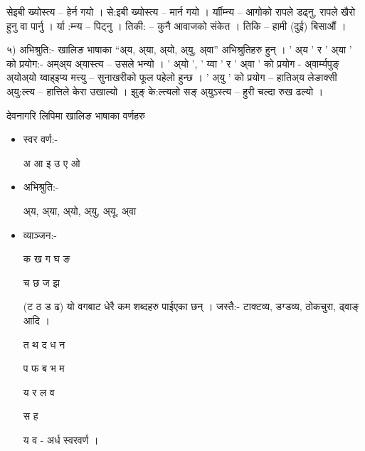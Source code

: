 सेइबी ख्योस्त्य –  हेर्न गयो । से:इबी ख्योस्त्य –  मार्न गयो ।
र्याीम्‍न्य – आगोको रापले डढ्‍नु, रापले खैरो हुनु वा पार्नु । र्या :म्‍न्य – पिट्‍नु । 
तिकी: – कुनै आवाजको संकेत । तिकि –  हामी (दुई) बिसाऔं ।

५) अभिश्रुति:- खालिङ भाषाका “अ‌्य, अ्या, अ्यो, अ्यु, अ्वा” अभिश्रुतिहरु हुन् । 
' अ्य ' र ' अ्या ' को प्रयोग:- अम्अ्य अ्यास्त्य – उसले भन्यो ।
' अ्यो ',  ' य्वा '  र  ' अ्वा ' को प्रयोग -  
अ्वार्म्यपुङ् अ्योअ्यो य्वाह्इप्य मत्त्यु – सुनाखरीको फूल पहेलो हुन्छ ।
' अ्यु ' को प्रयोग – 
हातिअ्य लेङाक्सी अ्यु:ल्त्य – हात्तिले केरा उखाल्यो ।
झुङ् के:ल्त्यलो सङ् अ्युऽस्त्य – हुरी चल्दा रुख ढल्यो ।

देवनागरि लिपिमा खालिङ भाषाका वर्णहरु
\begin{itemize}
\item स्वर वर्ण:- 

अ आ इ उ ए ओ 

\item अभिश्रुति:- 

अ्य, अ्या, अ्यो, अ्यु, अ्यू, अ्वा 

\item व्याञ्‍जन:-

क ख ग घ ङ    

च छ ज झ  

(ट ठ ड ढ) यो व\reph{}गबाट धेरै कम शब्दहरु पाईएका छन् । जस्तै:- टाक्टव्य, डग्डव्य, ठोकचुरा, ढ्वाङ् आदि ।
 
त थ द ध न 

प फ ब भ म    

य र ल व    

स  ह

य व - अर्ध स्वरवर्ण ।

\end{itemize}

\cleardoublepage
{}
\setcounter{page}{1}